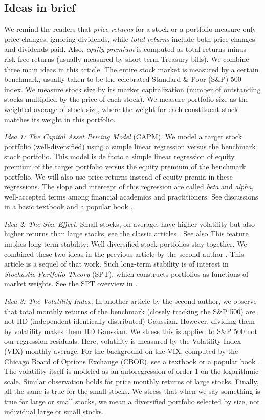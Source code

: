 \documentclass[12pt]{amsart}
\begin{document}
\subsection{Ideas in brief}  We remind the readers that {\it price returns} for a stock or a portfolio measure only price changes, ignoring dividends, while {\it total returns} include both price changes and dividends paid. Also, {\it equity premium} is computed as total returns minus risk-free returns (usually measured by short-term Treasury bills). We combine three main ideas in this article. The entire stock market is measured by a certain benchmark, usually taken to be the celebrated Standard \& Poor (S\&P) 500 index. We measure stock size by its market capitalization (number of outstanding stocks multiplied by the price of each stock). We measure portfolio size as the weighted average of stock size, where the weight for each constituent stock matches its weight in this portfolio.

{\it Idea 1: The Capital Asset Pricing Model} (CAPM). We model a target stock portfolio (well-diversified) using a simple linear regression versus the benchmark stock portfolio. This model is de facto a simple linear regression of equity premium of the target portfolio versus the equity premium of the benchmark portfolio. We will also use price returns instead of equity premia in these regressions. The slope and intercept of this regression are called {\it beta} and {\it alpha}, well-accepted terms among financial academics and practitioners. See discussions in a basic textbook \cite{Ang} and a popular book \cite{Siegel}. 

{\it Idea 2: The Size Effect.} Small stocks, on average, have higher volatility but also higher returns than large stocks, see the classic articles \cite{Banz, FF1993}. See also This feature implies long-term stability: Well-diversified stock portfolios stay together. We combined these two ideas in the previous article by the second author \cite{CAPM-size}. This article is a sequel of that work. Such long-term stability is of interest in {\it Stochastic Portfolio Theory} (SPT), which constructs portfolios as functions of market weights.  See the SPT overview in  \cite{FernholzBook, FKSurvey}.

{\it Idea 3: The Volatility Index.} In another article \cite{VIX} by the second author, we observe that total monthly returns of the benchmark (closely tracking the S\&P 500) are not IID (independent identically distributed) Gaussian. However, dividing them by volatility makes them IID Gaussian. We stress this is applied to S\&P 500 not our regression residuals. Here, volatility is measured by the Volatility Index (VIX) monthly average. For the background on the VIX, computed by the Chicago Board of Options Exchange (CBOE), see a textbook \cite{Ang} or a popular book \cite{Siegel}. The volatility itself is modeled as an autoregression of order 1 on the logarithmic scale. Similar observation holds for price monthly returns of large stocks. Finally, all the same is true for the small stocks. We stress that when we say something is true for large or small stocks, we mean a diversified portfolio selected by size, not individual large or small stocks.
\end{document}
